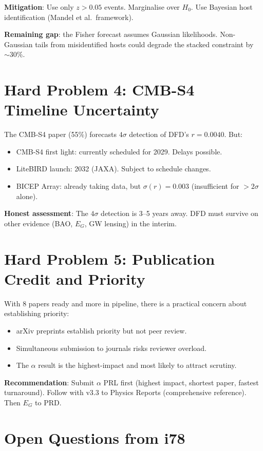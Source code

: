 \documentclass[11pt,a4paper]{article}
\begin{document}
\textbf{Mitigation}: Use only $z > 0.05$ events. Marginalise over $H_0$. Use Bayesian host identification (Mandel et al.\ framework).

\textbf{Remaining gap}: the Fisher forecast assumes Gaussian likelihoods. Non-Gaussian tails from misidentified hosts could degrade the stacked constraint by $\sim 30\%$.

\section{Hard Problem 4: CMB-S4 Timeline Uncertainty}

The CMB-S4 paper (55\%) forecasts $4\sigma$ detection of DFD's $r = 0.0040$. But:
\begin{itemize}[nosep]
\item CMB-S4 first light: currently scheduled for 2029. Delays possible.
\item LiteBIRD launch: 2032 (JAXA). Subject to schedule changes.
\item BICEP Array: already taking data, but $\sigma(r) = 0.003$ (insufficient for $> 2\sigma$ alone).
\end{itemize}

\textbf{Honest assessment}: The $4\sigma$ detection is 3--5 years away. DFD must survive on other evidence (BAO, $E_G$, GW lensing) in the interim.

\section{Hard Problem 5: Publication Credit and Priority}

With 8 papers ready and more in pipeline, there is a practical concern about establishing priority:
\begin{itemize}[nosep]
\item arXiv preprints establish priority but not peer review.
\item Simultaneous submission to journals risks reviewer overload.
\item The $\alpha$ result is the highest-impact and most likely to attract scrutiny.
\end{itemize}

\textbf{Recommendation}: Submit $\alpha$ PRL first (highest impact, shortest paper, fastest turnaround). Follow with v3.3 to Physics Reports (comprehensive reference). Then $E_G$ to PRD.

\section{Open Questions from i78}
\end{document}

